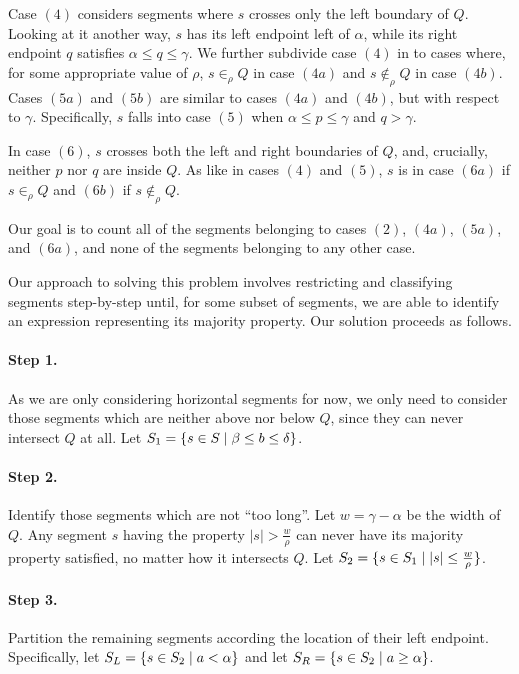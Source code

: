 Case $(4)$ considers segments where $s$ crosses only the left boundary of $Q$. Looking at it another way, $s$ has its left endpoint left of $\alpha$, while its right endpoint $q$ satisfies $\alpha \leq q \leq \gamma$.  We further subdivide case $(4)$ in to cases where, for some appropriate value of $\rho$, $s \in_\rho Q$ in case $(4a)$ and $s \not \in_\rho Q$ in case $(4b)$.  Cases $(5a)$ and $(5b)$ are similar to cases $(4a)$ and $(4b)$, but with respect to $\gamma$. Specifically, $s$ falls into case $(5)$ when $\alpha \leq p \leq \gamma$ and $q > \gamma$. 

In case $(6)$, $s$ crosses both the left and right boundaries of $Q$, and, crucially, neither $p$ nor $q$ are inside $Q$. As like in cases $(4)$ and $(5)$, $s$ is in case $(6a)$ if $s \in_\rho Q$ and $(6b)$ if $s \not \in_\rho Q$.

Our goal is to count all of the segments belonging to cases $(2)$, $(4a)$, $(5a)$, and $(6a)$, and none of the segments belonging to any other case.

Our approach to solving this problem involves restricting and classifying segments step-by-step until, for some subset of segments, we are able to identify an expression representing its majority property.  Our solution proceeds as follows.

\paragraph{Step 1.} As we are only considering horizontal segments for now, we only need to consider those segments which are neither above nor below $Q$, since they can never intersect $Q$ at all. Let $S_1 = \{ s \in S \;|\; \beta \leq b \leq \delta\}$. 

\paragraph{Step 2.} Identify those segments which are not ``too long''.  Let $w = \gamma - \alpha$ be the width of $Q$.  Any segment $s$ having the property $|s| > \frac{w}{\rho}$ can never have its majority property satisfied, no matter how it intersects $Q$.  Let $S_2 = \{ s \in S_1 \;|\; |s| \leq \frac{w}{\rho} \}$.

\paragraph{Step 3.} Partition the remaining segments according the location of their left endpoint.  Specifically, let $S_L = \{s \in S_2 \;|\; a < \alpha \}$ and let $S_R = \{ s \in S_2 \;|\; a \geq \alpha \}$.

